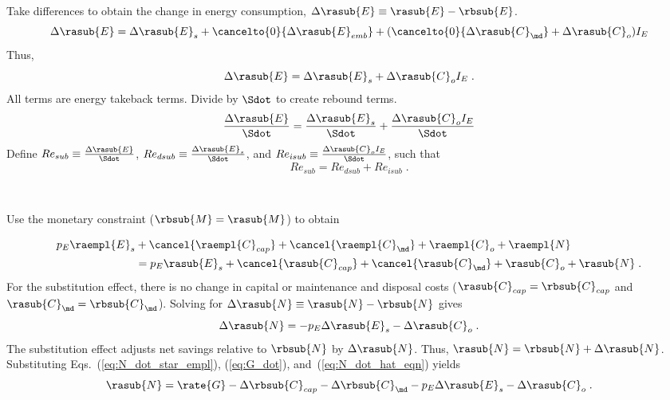 \begin{landscape}
{Take differences to obtain the change in energy consumption, $\Delta \rasub{E} \equiv \rasub{E} - \rbsub{E}$.
%
\begin{equation}
  \Delta \rasub{E} = \Delta \rasub{E}_s 
                      + \cancelto{0}{\Delta \rasub{E}_{emb}} 
                      + (\cancelto{0}{\Delta \rasub{C}_{\md}} + \Delta \rasub{C}_o) I_E
\end{equation}
%
Thus, 
%
\begin{equation}
  \Delta \rasub{E} = \Delta \rasub{E}_s + \Delta \rasub{C}_o I_E \; .
\end{equation}
%
All terms are energy takeback terms.
Divide by $\Sdot$
to create rebound terms.
%
\begin{equation}
    \frac{\Delta \rasub{E}}{\Sdot} = \frac{\Delta \rasub{E}_s}{\Sdot} + \frac{\Delta \rasub{C}_o I_E}{\Sdot}
\end{equation}
%
Define 
$Re_{sub} \equiv \frac{\Delta \rasub{E}}{\Sdot}$, 
$Re_{dsub} \equiv \frac{\Delta \rasub{E}_s}{\Sdot}$, and
$Re_{isub} \equiv \frac{\Delta \rasub{C}_o I_E}{\Sdot}$,
such that
%
\begin{equation} \label{eq:Re_sub_def}
  Re_{sub} = Re_{dsub} + Re_{isub} \; .
\end{equation}

}
{
~
  
Use the monetary constraint ($\rbsub{M} = \rasub{M}$) to obtain

\begin{align}
  p_E \raempl{E}_s &+ \cancel{\raempl{C}_{cap}} + \cancel{\raempl{C}_{\md}} + \raempl{C}_o + \raempl{N} \nonumber \\
                   &= p_E \rasub{E}_s + \cancel{\rasub{C}_{cap}} + \cancel{\rasub{C}_{\md}} + \rasub{C}_o + \rasub{N} \; .
\end{align}
%
For the substitution effect, there is no change in capital or maintenance and disposal costs
($\rasub{C}_{cap} = \rbsub{C}_{cap}$ and $\rasub{C}_{\md} = \rbsub{C}_{\md}$).
Solving for $\Delta \rasub{N} \equiv \rasub{N} - \rbsub{N}$ gives
%
\begin{equation} \label{eq:N_dot_hat_eqn}
  \Delta \rasub{N} = - p_E \Delta \rasub{E}_s - \Delta \rasub{C}_o \; .
\end{equation}
%
The substitution effect adjusts net savings relative to $\rbsub{N}$
by $\Delta \rasub{N}$.
Thus, $\rasub{N} = \rbsub{N} + \Delta \rasub{N}$.
Substituting Eqs.~(\ref{eq:N_dot_star_empl}), (\ref{eq:G_dot}), and~(\ref{eq:N_dot_hat_eqn})
yields
%
\begin{equation} \label{eq:N_dot_after_sub}
  \rasub{N} = \rate{G} - \Delta \rbsub{C}_{cap} - \Delta \rbsub{C}_{\md} - p_E \Delta \rasub{E}_s - \Delta \rasub{C}_o \; .
\end{equation}
%
}

\end{landscape}
